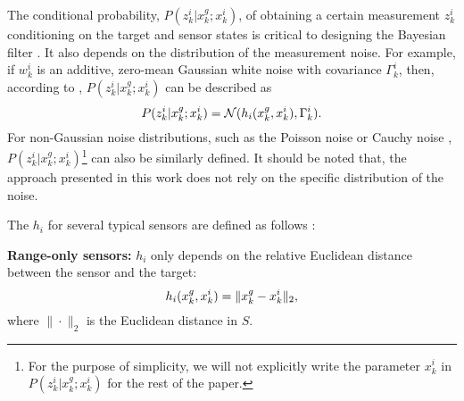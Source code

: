 	The conditional probability, $P(z^i_k|x^g_k;x^i_k)$, of obtaining a certain measurement $z^i_k$ conditioning on the target and sensor states is critical to designing the Bayesian filter \cite{thrun2005probabilistic}. 
	It also depends on the distribution of the measurement noise.
	For example, if $w^i_k$ is an additive, zero-mean Gaussian white noise with covariance $\Gamma_k^i$, then, according to , $P(z^i_k|x^g_k;x^i_k)$ can be described as
	\small\begin{equation*}%
		P(z^i_k|x^g_k;x^i_k)=\mathcal{N}(h_i(\xg_k,x^i_k),\Gamma_k^i).
	\end{equation*}\normalsize
	For non-Gaussian noise distributions, such as the Poisson noise or Cauchy noise \cite{kitagawa1996monte}, $P(z^i_k|x^g_k;x^i_k)$\footnote{For the purpose of simplicity, we will not explicitly write the parameter $x^{i}_k$ in $P(z^i_k|x^g_k;x^i_k)$ for the rest of the paper.} can also be similarly defined.
	It should be noted that, the approach presented in this work does not rely on the specific distribution of the noise.
	
	The $h_i$ for several typical sensors are defined as follows \cite{bishop2010optimality}:
	
	\textbf{Range-only sensors:} 
	$h_i$ only depends on the relative Euclidean distance between the sensor and the target:
	\begin{equation*}%
		h_i(\xg_k,x^i_k)=\|\xg_k-x^i_k\|_2,
	\end{equation*}	
	where $\|\cdot\|_2$ is the Euclidean distance in $S$.
	
